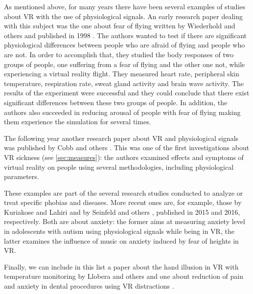 \documentclass[binding=0.6cm,LaM]{sapthesis}
\begin{document}
As mentioned above, for many years there have been several examples of studies about VR with the use of physiological signals. An early research paper dealing with this subject was the one about fear of flying written by Wiederhold and others and published in 1998 \cite{wiederhold1998fear}. The authors wanted to test if there are significant physiological differences between people who are afraid of flying and people who are not. In order to accomplish that, they studied the body responses of two groups of people, one suffering from a fear of flying and the other one not, while experiencing a virtual reality flight. They measured heart rate, peripheral skin temperature, respiration rate, sweat gland activity and brain wave activity. The results of the experiment were successful and they could conclude that there exist significant differences between these two groups of people. In addition, the authors also succeeded in reducing arousal of people with fear of flying making them experience the simulation for several times. 

The following year another research paper about VR and physiological signals was published by Cobb and others \cite{cobb1999virtual}. This was one of the first investigations about VR sickness (see \ref{sec:measures}): the authors examined effects and symptoms of virtual reality on people using several methodologies, including physiological parameters.

These examples are part of the several research studies conducted to analyze or treat specific phobias and diseases. More recent ones are, for example, those by Kuriakose and Lahiri \cite{kuriakose2015understanding} and by Seinfeld and others \cite{seinfeld2016influence}, published in 2015 and 2016, respectively. Both are about anxiety: the former aims at measuring anxiety level in adolescents with autism using physiological signals while being in VR, the latter examines the influence of music on anxiety induced by fear of heights in VR. 

Finally, we can include in this list a paper about the hand illusion in VR with temperature monitoring by Llobera and others \cite{llobera2013relationship} and one about reduction of pain and anxiety in dental procedures using VR distractions \cite{wiederhold2014clinical}.
\end{document}
